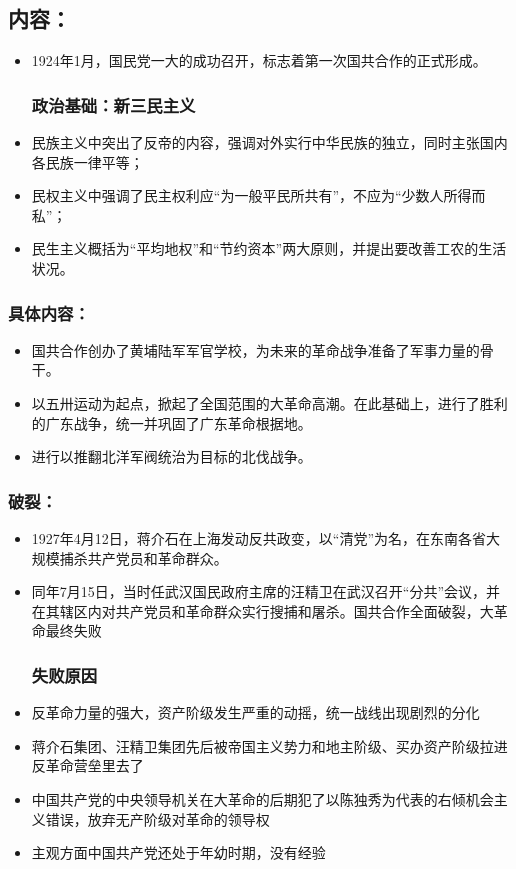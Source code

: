\documentclass{article}
\begin{document}
\subsection*{内容：}
\begin{itemize}
 	\subsubsection*{形成标志:}
   \item 1924年1月，国民党一大的成功召开，标志着第一次国共合作的正式形成。
  \subsubsection*{政治基础：新三民主义}
    
        \item 民族主义中突出了反帝的内容，强调对外实行中华民族的独立，同时主张国内各民族一律平等；
        \item 民权主义中强调了民主权利应“为一般平民所共有”，不应为“少数人所得而私”；
        \item 民生主义概括为“平均地权”和“节约资本”两大原则，并提出要改善工农的生活状况。
  

\end{itemize}
\subsubsection*{具体内容：}
\begin{itemize}
    \item 国共合作创办了黄埔陆军军官学校，为未来的革命战争准备了军事力量的骨干。
    \item 以五卅运动为起点，掀起了全国范围的大革命高潮。在此基础上，进行了胜利的广东战争，统一并巩固了广东革命根据地。
    \item 进行以推翻北洋军阀统治为目标的北伐战争。
\end{itemize}
\subsubsection*{破裂：}
\begin{itemize}
    \item 1927年4月12日，蒋介石在上海发动反共政变，以“清党”为名，在东南各省大规模捕杀共产党员和革命群众。
    \item 同年7月15日，当时任武汉国民政府主席的汪精卫在武汉召开“分共”会议，并在其辖区内对共产党员和革命群众实行搜捕和屠杀。国共合作全面破裂，大革命最终失败
    \subsubsection*{失败原因}
     
        \item 反革命力量的强大，资产阶级发生严重的动摇，统一战线出现剧烈的分化
        \item 蒋介石集团、汪精卫集团先后被帝国主义势力和地主阶级、买办资产阶级拉进反革命营垒里去了
        \item 中国共产党的中央领导机关在大革命的后期犯了以陈独秀为代表的右倾机会主义错误，放弃无产阶级对革命的领导权
        \item 主观方面中国共产党还处于年幼时期，没有经验
    
\end{itemize}
\end{document}
